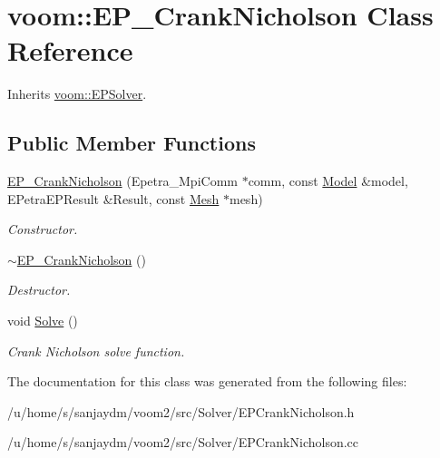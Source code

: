 \hypertarget{classvoom_1_1_e_p___crank_nicholson}{
\section{voom::EP\_\-CrankNicholson Class Reference}
\label{classvoom_1_1_e_p___crank_nicholson}
}


Inherits \hyperlink{classvoom_1_1_e_p_solver}{voom::EPSolver}.\subsection*{Public Member Functions}
\begin{DoxyCompactItemize}
\item 
\hypertarget{classvoom_1_1_e_p___crank_nicholson_ace50b1ad14c5562491db01f2eadcd208}{
\hyperlink{classvoom_1_1_e_p___crank_nicholson_ace50b1ad14c5562491db01f2eadcd208}{EP\_\-CrankNicholson} (Epetra\_\-MpiComm $\ast$comm, const \hyperlink{classvoom_1_1_model}{Model} \&model, EPetraEPResult \&Result, const \hyperlink{classvoom_1_1_mesh}{Mesh} $\ast$mesh)}
\label{classvoom_1_1_e_p___crank_nicholson_ace50b1ad14c5562491db01f2eadcd208}

\begin{DoxyCompactList}\small\item\em Constructor. \item\end{DoxyCompactList}\item 
\hypertarget{classvoom_1_1_e_p___crank_nicholson_a3a535541446828cbbf4b0e1e8823e408}{
\hyperlink{classvoom_1_1_e_p___crank_nicholson_a3a535541446828cbbf4b0e1e8823e408}{$\sim$EP\_\-CrankNicholson} ()}
\label{classvoom_1_1_e_p___crank_nicholson_a3a535541446828cbbf4b0e1e8823e408}

\begin{DoxyCompactList}\small\item\em Destructor. \item\end{DoxyCompactList}\item 
\hypertarget{classvoom_1_1_e_p___crank_nicholson_a6be9e6e44b8fa95b085b661700eded66}{
void \hyperlink{classvoom_1_1_e_p___crank_nicholson_a6be9e6e44b8fa95b085b661700eded66}{Solve} ()}
\label{classvoom_1_1_e_p___crank_nicholson_a6be9e6e44b8fa95b085b661700eded66}

\begin{DoxyCompactList}\small\item\em Crank Nicholson solve function. \item\end{DoxyCompactList}\end{DoxyCompactItemize}


The documentation for this class was generated from the following files:\begin{DoxyCompactItemize}
\item 
/u/home/s/sanjaydm/voom2/src/Solver/EPCrankNicholson.h\item 
/u/home/s/sanjaydm/voom2/src/Solver/EPCrankNicholson.cc\end{DoxyCompactItemize}
